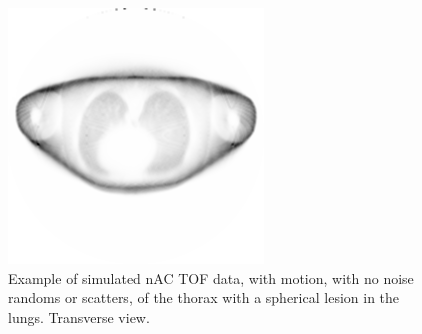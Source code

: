                 \begin{figure}
                    \centering
                    
                    \includegraphics[width=1.0\linewidth]{figures/background_nAC_example.png}
                    
                    \captionsetup{singlelinecheck=false, justification=raggedright}
                    \caption{Example of simulated \gls{nAC} \gls{TOF} data, with motion, with no noise randoms or scatters, of the thorax with a spherical lesion in the lungs. Transverse view.} \label{fig:combined_pet_ct_nAC_tof_example}
                \end{figure}
                
